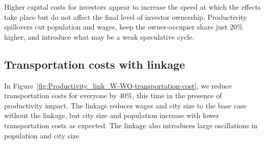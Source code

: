Higher capital costs for investors appear to increase the speed at which the effects take place but do not affect the final level of investor ownership. Productivity spillovers cut population and wages, keep the owner-occupier share just 20\% higher, and introduce what may be a weak speculative cycle. %


\newpage

\subsection{Transportation costs  with linkage}\label{subsec-transport-link}

In Figure~\ref{fig:Productivity_link_W-WO-transportation-cost}, we reduce transportation costs for everyone by 40\%, this time in the presence of productivity impact. The linkage reduces wages and city size to the base case without the linkage, but city size and population increase with lower transportation costs as expected. The linkage also introduces large oscillations in population and city size.  %



